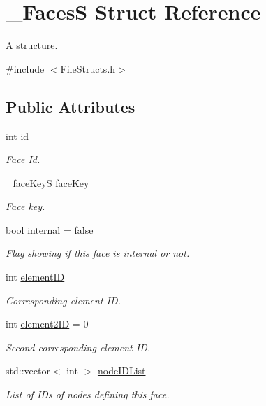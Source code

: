 \hypertarget{struct___faces_s}{}\section{\+\_\+\+FacesS Struct Reference}
\label{struct___faces_s}


A structure.  




{\ttfamily \#include $<$File\+Structs.\+h$>$}

\subsection*{Public Attributes}
\begin{DoxyCompactItemize}
\item 
int \hyperlink{struct___faces_s_a7365ff5c5951b2a61ef5e4411b0d521a}{id}
\begin{DoxyCompactList}\small\item\em Face Id. \end{DoxyCompactList}\item 
\hyperlink{_file_structs_8h_a3f1328036ba69b8a38f4d1743a5c8742}{\+\_\+face\+KeyS} \hyperlink{struct___faces_s_a0b72e5930902a49f376d035d654ecef8}{face\+Key}
\begin{DoxyCompactList}\small\item\em Face key. \end{DoxyCompactList}\item 
bool \hyperlink{struct___faces_s_a5ce239e336aea528dad6008a6f2909f0}{internal} = false
\begin{DoxyCompactList}\small\item\em Flag showing if this face is internal or not. \end{DoxyCompactList}\item 
int \hyperlink{struct___faces_s_a96e133867444b5c1ab6b0ebd281de0fb}{element\+ID}
\begin{DoxyCompactList}\small\item\em Corresponding element ID. \end{DoxyCompactList}\item 
int \hyperlink{struct___faces_s_a6a710d10167fc0966c6b1fd763c55603}{element2\+ID} = 0
\begin{DoxyCompactList}\small\item\em Second corresponding element ID. \end{DoxyCompactList}\item 
std\+::vector$<$ int $>$ \hyperlink{struct___faces_s_a1af35bd658b7be0f98e09deb5f8b3ead}{node\+I\+D\+List}
\begin{DoxyCompactList}\small\item\em List of I\+Ds of nodes defining this face. \end{DoxyCompactList}\end{DoxyCompactItemize}


